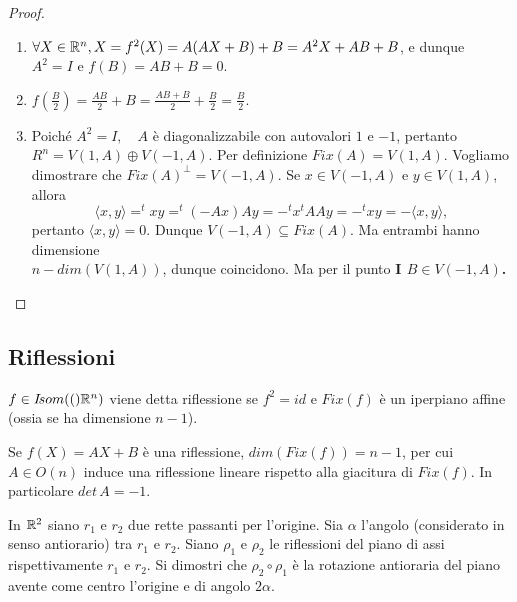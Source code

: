 \documentclass[a4paper,12pt]{article}
\newcommand{\Got}[1]{#1}
\newcommand{\got}[1]{{#1}}
\begin{document}
 \begin{proof}
 \begin{enumerate}[label=\bf\Roman*)]
 \item $\got{\forall X\in \R^n,  X=f^2(X)=A(AX+B)+B=A^2X+AB+B}$, \Got{e dunque}\\
 $\got{A^2=I}$ \Got{e} $\got{f(B)=AB+B=0}$.
 \item $\got{f(\frac{B}{2})=\frac{AB}{2}+B=\frac{AB+B}{2}+\frac{B}{2}=\frac{B}{2}}$.
 \item Poiché $\got{A^2=I},\quad A$ \Got{è diagonalizzabile con autovalori} $\got{1}$ \Got{e} $\got{-1}$, \Got{pertanto}\\
 $\got{R^n=V(1,A)\oplus V(-1,A)}$. \Got{Per definizione} $\got{Fix(A)=V(1,A)}$. \Got{Vogliamo dimostrare che} $\got{Fix(A)^{\bot}=V(-1,A)}$.
 \Got{Se} $\got{x\in V(-1,A)}$ \Got{e} $\got{y\in V(1,A)}$, \Got{allora} $$\got{\langle x,y\rangle=^txy=^t(-Ax)Ay=-^tx^tAAy=-^txy=
 -\langle x,y\rangle},$$ \Got{pertanto} $\got{\langle x,y\rangle=0}.$
 \Got{Dunque} $\got{V(-1,A)\subseteq Fix(A)}$. \Got{Ma entrambi hanno dimensione}\\
 $\got{n-dim(V(1,A))}$, \Got{dunque coincidono.
 Ma per il punto \bf{I}} $\got{B\in V(-1,A)}$.
 \end{enumerate}
  \end{proof}
 
	\subsection{Riflessioni}
 
 $\got{f\in \Isom(\R^n)}$ \Got{viene detta riflessione se} $\got{f^2=id}$ \Got{e} $\got{Fix(f)}$ 
 \Got{è un iperpiano affine (ossia se ha dimensione} $\got{n-1}$).
 
 \begin{remark}
 \Got{Se} $\got{f(X)=AX+B}$ \Got{è una riflessione,} $\got{dim(Fix(f))=n-1}$, \Got{per cui}\\
 $\got{A\in O(n)}$ \Got{induce una riflessione lineare rispetto alla giacitura di} $\got{Fix(f)}$. \Got{In particolare} $\got{det\,A=-1}$.
 \end{remark}
 
 \begin{exercise}
\Got{In} $\got{\R^2}$ \Got{siano} $\got{r_1}$ \Got{e} $\got{r_2}$ \Got{due rette passanti per l'origine. Sia} $\got{\alpha}$
 \Got{l'angolo (considerato in senso antiorario) tra} $\got{r_1}$ \Got{e} $\got{r_2}$. \Got{Siano} $\got{\rho_1}$ \Got{e} $\got{\rho_2}$
 \Got{le riflessioni del piano di assi rispettivamente} $\got{r_1}$ \Got{e} $\got{r_2}$.
 \Got{Si dimostri che} $\got{\rho_2}\circ\got{\rho_1}$ \Got{è la rotazione antioraria del piano avente come centro l'origine e di angolo} 
 $\got{2\alpha}$.
 \end{exercise}
 
\end{document}

